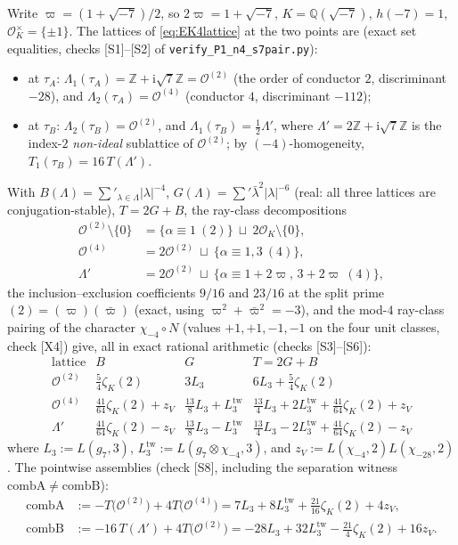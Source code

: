 \documentclass[11pt]{article}
\newcommand{\Qq}{\mathbb{Q}}
\newcommand{\Zz}{\mathbb{Z}}
\newcommand{\ii}{\mathrm{i}}
\newcommand{\OO}{\mathcal{O}}
\theoremstyle{definition}
\theoremstyle{remark}
\begin{document}
Write $\varpi=(1+\sqrt{-7})/2$, so $2\varpi=1+\sqrt{-7}$,
$K=\Qq(\sqrt{-7})$, $h(-7)=1$, $\OO_K^\times=\{\pm1\}$. The lattices
of \eqref{eq:EK4lattice} at the two points are (exact set equalities,
checks [S1]--[S2] of \texttt{verify\_P1\_n4\_s7pair.py}):
\begin{itemize}
\item at $\tau_A$: $\Lambda_1(\tau_A)=\Zz+\ii\sqrt7\Zz=\OO^{(2)}$
  (the order of conductor $2$, discriminant $-28$), and
  $\Lambda_2(\tau_A)=\OO^{(4)}$ (conductor $4$, discriminant $-112$);
\item at $\tau_B$: $\Lambda_2(\tau_B)=\OO^{(2)}$, and
  $\Lambda_1(\tau_B)=\tfrac12\Lambda'$, where
  $\Lambda'=2\Zz+\ii\sqrt7\Zz$ is the index-$2$ \emph{non-ideal}
  sublattice of $\OO^{(2)}$; by $(-4)$-homogeneity,
  $T_1(\tau_B)=16\,T(\Lambda')$.
\end{itemize}
With $B(\Lambda)=\sum'_{\lambda\in\Lambda}|\lambda|^{-4}$,
$G(\Lambda)=\sum'\bar\lambda^2|\lambda|^{-6}$ (real: all three
lattices are conjugation-stable), $T=2G+B$, the ray-class
decompositions
\begin{align*}
  \OO^{(2)}\setminus\{0\}&=\{\alpha\equiv1\ (2)\}\ \sqcup\
   2\OO_K\setminus\{0\},\\
  \OO^{(4)}&=2\OO^{(2)}\ \sqcup\ \{\alpha\equiv1,3\ (4)\},\\
  \Lambda'&=2\OO^{(2)}\ \sqcup\ \{\alpha\equiv1{+}2\varpi,\,
   3{+}2\varpi\ (4)\},
\end{align*}
the inclusion--exclusion coefficients $9/16$ and $23/16$ at the split
prime $(2)=(\varpi)(\bar\varpi)$ (exact, using
$\varpi^2+\bar\varpi^2=-3$), and the mod-$4$ ray-class pairing of the
character $\chi_{-4}\circ N$ (values $+1,+1,-1,-1$ on the four unit
classes, check [X4]) give, all in exact rational arithmetic
(checks [S3]--[S6]):
\[
\begin{array}{c|cc|c}
\text{lattice} & B & G & T=2G+B\\ \hline
\OO^{(2)} & \frac54\zeta_K(2) & 3L_3 & 6L_3+\frac54\zeta_K(2)\\
\OO^{(4)} & \frac{41}{64}\zeta_K(2)+z_V & \frac{13}{8}L_3+L_3^{\mathrm{tw}}
 & \frac{13}{4}L_3+2L_3^{\mathrm{tw}}+\frac{41}{64}\zeta_K(2)+z_V\\
\Lambda' & \frac{41}{64}\zeta_K(2)-z_V & \frac{13}{8}L_3-L_3^{\mathrm{tw}}
 & \frac{13}{4}L_3-2L_3^{\mathrm{tw}}+\frac{41}{64}\zeta_K(2)-z_V
\end{array}
\]
where $L_3:=L(g_7,3)$, $L_3^{\mathrm{tw}}:=L(g_7\otimes\chi_{-4},3)$,
and $z_V:=L(\chi_{-4},2)L(\chi_{-28},2)$. The pointwise assemblies
(check [S8], including the separation witness
$\mathrm{combA}\neq\mathrm{combB}$):
\begin{align*}
  \mathrm{combA}&:=-T\bigl(\OO^{(2)}\bigr)+4T\bigl(\OO^{(4)}\bigr)
   =7L_3+8L_3^{\mathrm{tw}}+\frac{21}{16}\zeta_K(2)+4z_V,\\
  \mathrm{combB}&:=-16\,T(\Lambda')+4T\bigl(\OO^{(2)}\bigr)
   =-28L_3+32L_3^{\mathrm{tw}}-\frac{21}{4}\zeta_K(2)+16z_V .
\end{align*}
\end{document}
